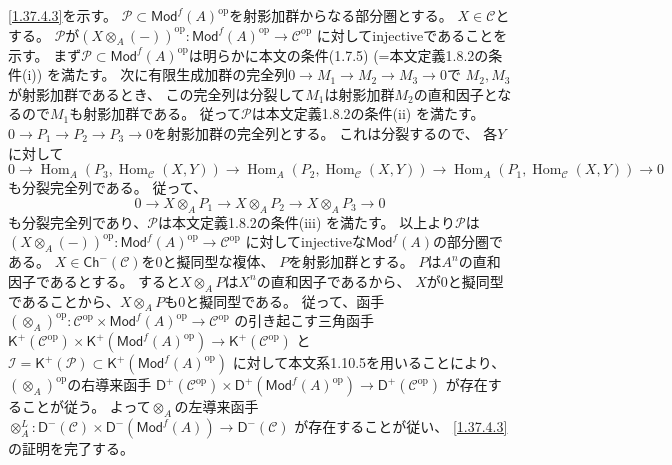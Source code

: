 \documentclass[uplatex,dvipdfmx]{jsarticle}
\makeatletter
\theoremstyle{definition}
\renewenvironment{proof}[1][\proofname]{
  \pushQED{\qed}%
  \normalfont \topsep6\p@\@plus6\p@\relax
  \trivlist
  \item[\hskip\labelsep
    #1\@addpunct{\textbf{.}}]\ignorespaces
}{%
  \popQED\endtrivlist\@endpefalse
}
\providecommand{\proofname}{証明}
\DeclareMathOperator{\Hom}{\mathrm{Hom}}
\newcommand{\op}{\mathrm{op}}
\newcommand{\Ch}{\mathsf{Ch}}
\newcommand{\Mod}{\mathsf{Mod}}
\newcommand{\sfK}{\mathsf{K}}
\newcommand{\sfD}{\mathsf{D}}
\newcommand\mcC{\mathcal{C}}
\newcommand\mcI{\mathcal{I}}
\newcommand\mcP{\mathcal{P}}
\makeatother
\begin{document}
\begin{proof}
  \ref{1.37.4.3}を示す。
  \(\mcP\subset \Mod^f(A)^{\op}\)を射影加群からなる部分圏とする。
  \(X\in \mcC\)とする。
  \(\mcP\)が\((X\otimes_A (-))^{\op}:\Mod^f(A)^{\op}\to \mcC^{\op}\)
  に対してinjectiveであることを示す。
  まず\(\mcP\subset \Mod^f(A)^{\op}\)は明らかに本文の条件(1.7.5)
  (=本文定義1.8.2の条件(i)) を満たす。
  次に有限生成加群の完全列\(0\to M_1\to M_2\to M_3\to 0\)で
  \(M_2,M_3\)が射影加群であるとき、
  この完全列は分裂して\(M_1\)は射影加群\(M_2\)の直和因子となるので\(M_1\)も射影加群である。
  従って\(\mcP\)は本文定義1.8.2の条件(ii) を満たす。
  \(0\to P_1\to P_2\to P_3\to 0\)を射影加群の完全列とする。
  これは分裂するので、
  各\(Y\)に対して
  \[
  0\to \Hom_A(P_3,\Hom_{\mcC}(X,Y))
  \to \Hom_A(P_2,\Hom_{\mcC}(X,Y))
  \to \Hom_A(P_1,\Hom_{\mcC}(X,Y)) \to 0
  \]
  も分裂完全列である。
  従って、
  \[0\to X\otimes_A P_1\to X\otimes_A P_2\to X\otimes_A P_3\to 0\]
  も分裂完全列であり、\(\mcP\)は本文定義1.8.2の条件(iii) を満たす。
  以上より\(\mcP\)は\((X\otimes_A (-))^{\op}:\Mod^f(A)^{\op}\to \mcC^{\op}\)
  に対してinjectiveな\(\Mod^f(A)\)の部分圏である。
  \(X\in \Ch^-(\mcC)\)を\(0\)と擬同型な複体、
  \(P\)を射影加群とする。
  \(P\)は\(A^n\)の直和因子であるとする。
  すると\(X\otimes_A P\)は\(X^n\)の直和因子であるから、
  \(X\)が\(0\)と擬同型であることから、\(X\otimes_A P\)も\(0\)と擬同型である。
  従って、函手\((\otimes_A)^{\op}:\mcC^{\op}\times \Mod^f(A)^{\op}\to \mcC^{\op}\)
  の引き起こす三角函手
  \(\sfK^+(\mcC^{\op}) \times \sfK^+(\Mod^f(A)^{\op})\to \sfK^+(\mcC^{\op})\)
  と\(\mcI = \sfK^+(\mcP)\subset \sfK^+(\Mod^f(A)^{\op})\)
  に対して本文系1.10.5を用いることにより、
  \((\otimes_A)^{\op}\)の右導来函手
  \(\sfD^+(\mcC^{\op}) \times \sfD^+(\Mod^f(A)^{\op})\to \sfD^+(\mcC^{\op})\)
  が存在することが従う。
  よって\(\otimes_A\)の左導来函手
  \(\otimes_A^L:\sfD^-(\mcC) \times \sfD^-(\Mod^f(A))\to \sfD^-(\mcC)\)
  が存在することが従い、
  \ref{1.37.4.3}の証明を完了する。


\end{proof}
\end{document}
